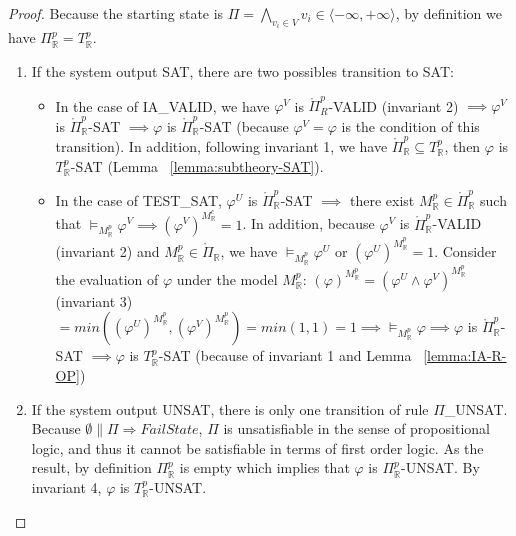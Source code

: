 \begin{proof} Because the starting state is $\Pi = \bigwedge\limits_{v_i \in V} v_i \in \langle -\infty, +\infty \rangle$, by definition we have $\Pi^p_\mathbb{R} = T^p_\mathbb{R}$.
\begin{enumerate}
\item If the system output SAT, there are two possibles transition to SAT:
\begin{itemize}
\item In the case of IA\_VALID, we have $\varphi^V$ is $\mathring{\Pi}_{R}^p$-VALID (invariant 2) $\implies \varphi^V$ is $\mathring{\Pi}^p_\mathbb{R}$-SAT $\implies \varphi$ is $\mathring{\Pi}^p_\mathbb{R}$-SAT (because $\varphi^V = \varphi$ is the condition of this transition). In addition, following invariant 1, we have $\mathring{\Pi}^p_\mathbb{R} \subseteq T^p_\mathbb{R}$, then $\varphi$ is $T^p_\mathbb{R}$-SAT (Lemma ~\ref{lemma:subtheory-SAT}).
\item \sloppy In the case of TEST\_SAT, $\varphi^U$ is $\mathring{\Pi}^p_\mathbb{R}$-SAT $\implies$ there exist $M^p_\mathbb{R} \in \mathring{\Pi}^p_\mathbb{R}$ such that $\models_{M^p_\mathbb{R}} \varphi^V \implies (\varphi^V)^{M^c_\mathbb{R}} = 1$. In addition, because $\varphi^V$ is $\mathring{\Pi}^p_\mathbb{R}$-VALID (invariant 2) and $M^p_\mathbb{R} \in \mathring{\Pi}_\mathbb{R}$, we have $\models_{M^p_\mathbb{R}} \varphi^U$ or ${(\varphi^U)^{M^p_\mathbb{R}} = 1}$. Consider the evaluation of $\varphi$ under the model $M^p_\mathbb{R}$: ${(\varphi)^{M^p_\mathbb{R}} = (\varphi^U \wedge \varphi^V)^{M^p_\mathbb{R}}}$ (invariant 3) $= min((\varphi^U)^{M^p_\mathbb{R}}, (\varphi^V)^{M^p_\mathbb{R}}) = min(1, 1) = 1 \implies \models_{M^p_\mathbb{R}} \varphi \implies \varphi$ is $\mathring{\Pi}^p_\mathbb{R}$-SAT $\implies \varphi$ is $T^p_\mathbb{R}$-SAT (because of invariant 1 and Lemma ~\ref{lemma:IA-R-OP})
\end{itemize}
\item  If the system output UNSAT, there is only one transition of rule $\Pi$\_UNSAT. Because $\emptyset \parallel \Pi \Longrightarrow FailState$, $\Pi$ is unsatisfiable in the sense of propositional logic, and thus it cannot be satisfiable in terms of first order logic. As the result, by definition $\Pi^p_\mathbb{R}$ is empty which implies that $\varphi$ is $\Pi^p_\mathbb{R}$-UNSAT. By invariant 4, $\varphi$ is $T^p_\mathbb{R}$-UNSAT.
\end{enumerate}
\end{proof}

